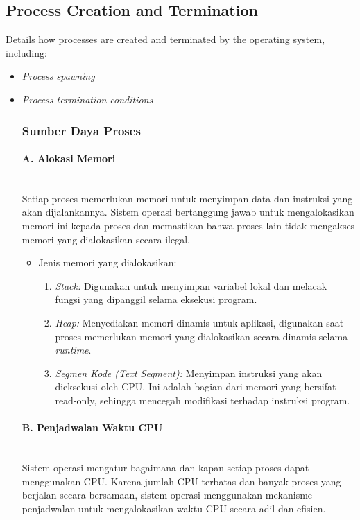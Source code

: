 \documentclass[12pt]{article}
\begin{document}
\subsection{Process Creation and Termination}
Details how processes are created and terminated by the operating system, including:
\begin{itemize}
    \item \textit{Process spawning}
    \item \textit{Process termination conditions}
    \subsubsection{Sumber Daya Proses}

    \paragraph{A. Alokasi Memori} \mbox{} \\
    Setiap proses memerlukan memori untuk menyimpan data dan instruksi yang akan dijalankannya. Sistem operasi bertanggung jawab untuk mengalokasikan memori ini kepada proses dan memastikan bahwa proses lain tidak mengakses memori yang dialokasikan secara ilegal.

    \begin{itemize}
        \item Jenis memori yang dialokasikan:
        \begin{enumerate}
            \item \textit{Stack:} Digunakan untuk menyimpan variabel lokal dan melacak fungsi yang dipanggil selama eksekusi program.
            \item \textit{Heap:} Menyediakan memori dinamis untuk aplikasi, digunakan saat proses memerlukan memori yang dialokasikan secara dinamis selama \textit{runtime}.
            \item \textit{Segmen Kode (Text Segment):} Menyimpan instruksi yang akan dieksekusi oleh CPU. Ini adalah bagian dari memori yang bersifat read-only, sehingga   mencegah modifikasi terhadap instruksi program.
        \end{enumerate}
    \end{itemize}

    \paragraph{B. Penjadwalan Waktu CPU} \mbox{} \\
    Sistem operasi mengatur bagaimana dan kapan setiap proses dapat menggunakan CPU. Karena jumlah CPU terbatas dan banyak proses yang berjalan secara bersamaan, sistem operasi menggunakan mekanisme penjadwalan untuk mengalokasikan waktu CPU secara adil dan efisien.


\end{itemize}
\end{document}
